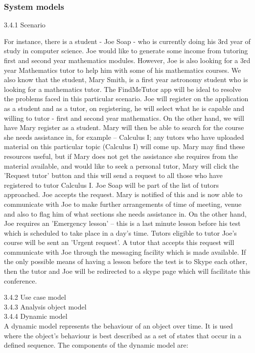 \documentclass[12pt]{article}
\begin{document}
\subsubsection{System models}
3.4.1 Scenario
\begin{flushleft}
For instance, there is a student - Joe Soap - who is currently doing his  3rd year of study in computer science.  Joe would like to generate some income from tutoring first and second year mathematics modules. However, Joe is also looking for a 3rd year Mathematics tutor to help him with some of his mathematics courses. We also know that the student, Mary Smith, is a first year astronomy student who is looking for a mathematics tutor. The FindMeTutor app will be ideal to resolve the problems faced in this particular scenario. Joe will register on the application as a student and as a tutor, on registering, he will select what he is capable and willing to tutor - first and second year mathematics. On the other hand, we will have Mary register as a student. Mary will then be able to search for the course she needs assistance in, for example – Calculus I; any tutors who have uploaded material on this particular topic (Calculus I) will come up. Mary may find these resources useful, but if Mary does not get the assistance she requires from the material available, and would like to seek a personal tutor, Mary will click the 'Request tutor' button and this will send a request to all those who have registered to tutor Calculus I. Joe Soap will be part of the list of tutors approached. Joe accepts the request. Mary is notified of this and is now able to communicate with Joe to make further arrangements of time of meeting, venue and also to flag him of what sections she needs assistance in. On the other hand, Joe requires an 'Emergency lesson' – this is a last minute lesson before his test which is scheduled to take place in a day's time. Tutors eligible to tutor Joe's course will be sent an 'Urgent request'. A tutor that accepts this request will communicate with Joe through the messaging facility which is made available. If the only possible means of having a lesson before the test is to Skype each other, then the tutor and Joe will be redirected to a skype page which will facilitate this conference.
\end{flushleft}
3.4.2 Use case model\\
3.4.3 Analysis object model\\
3.4.4 Dynamic model\\
A dynamic model represents the behaviour of an object over time. It is used where the object's behaviour is best described as a set of states that occur in a defined sequence. The components of the dynamic model are:\\
\end{document}
